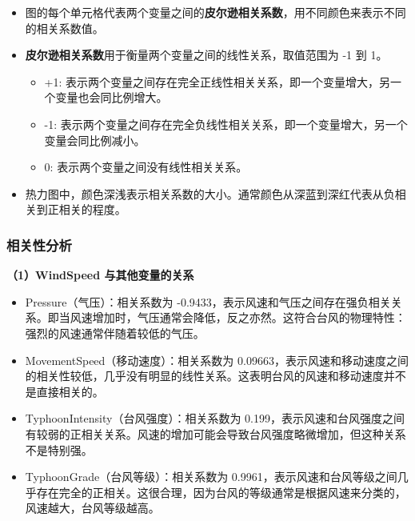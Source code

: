 \documentclass[withoutpreface,bwprint]{cumcmthesis}
\begin{document}
\begin{itemize}
    \setlength{\itemindent}{2em}
    \item 图的每个单元格代表两个变量之间的\textbf{皮尔逊相关系数}，用不同颜色来表示不同的相关系数值。

    \item \textbf{皮尔逊相关系数}用于衡量两个变量之间的线性关系，取值范围为 -1 到 1。
    
        \begin{itemize}
            \setlength{\itemindent}{2em}
            \renewcommand{\labelitemi}{}  %
            \renewcommand{\labelitemii}{} %
            \item +1: 表示两个变量之间存在完全正线性相关关系，即一个变量增大，另一个变量也会同比例增大。
            \item -1: 表示两个变量之间存在完全负线性相关关系，即一个变量增大，另一个变量会同比例减小。
            \item 0: 表示两个变量之间没有线性相关关系。
        \end{itemize}



    \item 热力图中，颜色深浅表示相关系数的大小。通常颜色从深蓝到深红代表从负相关到正相关的程度。
\end{itemize}

\subsubsection{相关性分析}

\textbf{（1）WindSpeed 与其他变量的关系}

\begin{itemize}
    \setlength{\itemindent}{2em}
    \item Pressure（气压）：相关系数为 -0.9433，表示风速和气压之间存在强负相关关系。即当风速增加时，气压通常会降低，反之亦然。这符合台风的物理特性：强烈的风速通常伴随着较低的气压。

    \item MovementSpeed（移动速度）：相关系数为 0.09663，表示风速和移动速度之间的相关性较低，几乎没有明显的线性关系。这表明台风的风速和移动速度并不是直接相关的。

    \item TyphoonIntensity（台风强度）：相关系数为 0.199，表示风速和台风强度之间有较弱的正相关关系。风速的增加可能会导致台风强度略微增加，但这种关系不是特别强。

    \item TyphoonGrade（台风等级）：相关系数为 0.9961，表示风速和台风等级之间几乎存在完全的正相关。这很合理，因为台风的等级通常是根据风速来分类的，风速越大，台风等级越高。
\end{itemize}
\end{document}
